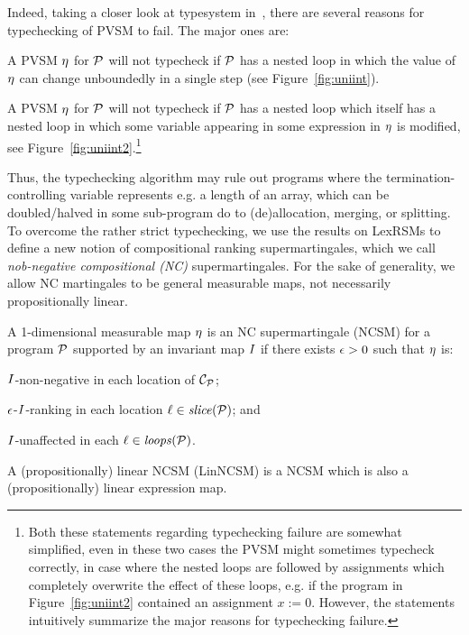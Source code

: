 Indeed, taking a closer look at typesystem in~\cite{HolgerPOPL}, there are several reasons for typechecking of PVSM to fail. The major ones are:
\begin{compactenum}
\item
A PVSM $\eta$ for \PP{} $\mathcal{P}$ will not typecheck if $\mathcal{P}$ has a 
nested loop in which the value of $\eta$ can change unboundedly in a single 
step (see Figure~\ref{fig:uniint}). 
\item
A PVSM $\eta$ for  \PP{} $\mathcal{P}$ will not typecheck if $\mathcal{P}$ has a 
nested loop which itself has a nested loop in which some variable appearing in 
some expression in $\eta$ is modified, see 
Figure~\ref{fig:uniint2}.\footnote{Both these statements regarding typechecking 
failure are somewhat simplified, even in these two cases the PVSM might 
sometimes typecheck correctly, in case where the nested loops are followed by 
assignments which completely overwrite the effect of these loops, e.g. if 
the program in Figure~\ref{fig:uniint2} contained an assignment $x:=0$. 
However, the statements intuitively 
summarize the major reasons for typechecking failure. }
\end{compactenum}



Thus, the typechecking algorithm may rule out programs where the termination-controlling variable represents e.g. a length of an array, which can be doubled/halved in some sub-program do to (de)allocation, merging, or splitting.
To overcome the rather strict typechecking, we use the results on LexRSMs to define a new notion of compositional ranking supermartingales, which we call \emph{nob-negative compositional (NC)} supermartingales. For the sake of generality, we allow NC martingales to be general measurable maps, not necessarily propositionally linear.

\begin{definition}
\label{def:nonneg-comp}
A 1-dimensional measurable map $\eta$ is an NC supermartingale (NCSM) for a program $\mathcal{P}$ supported by an invariant map $I$ if there exists $\epsilon>0$ such that $\eta$ is:
\begin{compactenum}
\item  $I$-non-negative in each location of $\mathcal{C}_{\mathcal{P}}$;
\item 
 $\epsilon$-$I$-ranking in each location $\ell\in\mathit{slice}{(\mathcal{P})}$; and
\item 
  $I$-unaffected in each $\ell\in\mathit{loops}(\mathcal{P})$.
\end{compactenum}
A (propositionally) linear NCSM (LinNCSM) is a NCSM which is also a (propositionally) linear expression map.
\end{definition}



